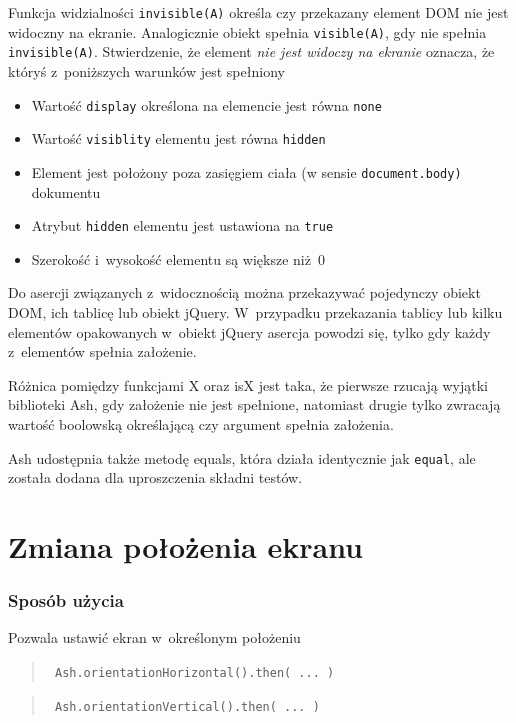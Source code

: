 \documentclass[brudnopis]{xmgr}
\begin{document}
Funkcja widzialności \texttt{invisible(A)} określa czy przekazany element DOM nie jest widoczny na ekranie. Analogicznie obiekt spełnia \texttt{visible(A)}, gdy nie spełnia \texttt{invisible(A)}. Stwierdzenie, że element {\it nie jest widoczy na ekranie} oznacza, że któryś z~poniższych warunków jest spełniony

\begin{itemize}
  \item Wartość \texttt{display} określona na elemencie jest równa \texttt{none}
  \item Wartość \texttt{visiblity} elementu jest równa \texttt{hidden}
  \item Element jest położony poza zasięgiem ciała (w sensie \texttt{document.body)} dokumentu
  \item Atrybut \texttt{hidden} elementu jest ustawiona na \texttt{true}
  \item Szerokość i~wysokość elementu są większe niż~0
\end{itemize}

Do asercji związanych z~widocznością można przekazywać pojedynczy obiekt DOM, ich tablicę lub obiekt jQuery. W~przypadku przekazania tablicy lub kilku elementów opakowanych w~obiekt jQuery asercja powodzi się, tylko gdy każdy z~elementów spełnia założenie. 

Różnica pomiędzy funkcjami X oraz isX jest taka, że pierwsze rzucają wyjątki biblioteki Ash, gdy założenie nie jest spełnione, natomiast drugie tylko zwracają wartość boolowską określającą czy argument spełnia założenia.  

Ash udostępnia także metodę equals, która działa identycznie jak \texttt{equal}, ale została dodana dla uproszczenia składni testów.

\section{Zmiana położenia ekranu}

\subsubsection{Sposób użycia}
Pozwala ustawić ekran w~określonym położeniu

\begin{quote}
  \texttt{  Ash.orientationHorizontal().then( ... )  }
\end{quote}

\begin{quote}
  \texttt{  Ash.orientationVertical().then( ... )  } 
\end{quote}
\end{document}
